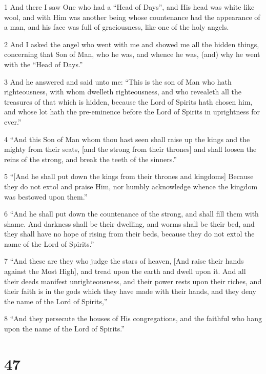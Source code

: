 \par 1 And there I saw One who had a “Head of Days”, and His head was white like wool, and with Him was another being whose countenance had the appearance of a man, and his face was full of graciousness, like one of the holy angels.
\par 2 And I asked the angel who went with me and showed me all the hidden things, concerning that Son of Man, who he was, and whence he was, (and) why he went with the “Head of Days.”
\par 3 And he answered and said unto me: “This is the son of Man who hath righteousness, with whom dwelleth righteousness, and who revealeth all the treasures of that which is hidden, because the Lord of Spirits hath chosen him, and whose lot hath the pre-eminence before the Lord of Spirits in uprightness for ever.”
\par 4 “And this Son of Man whom thou hast seen shall raise up the kings and the mighty from their seats, [and the strong from their thrones] and shall loosen the reins of the strong, and break the teeth of the sinners.”
\par 5 “[And he shall put down the kings from their thrones and kingdoms] Because they do not extol and praise Him, nor humbly acknowledge whence the kingdom was bestowed upon them.”
\par 6 “And he shall put down the countenance of the strong, and shall fill them with shame. And darkness shall be their dwelling, and worms shall be their bed, and they shall have no hope of rising from their beds, because they do not extol the name of the Lord of Spirits.”
\par 7 “And these are they who judge the stars of heaven, [And raise their hands against the Most High], and tread upon the earth and dwell upon it. And all their deeds manifest unrighteousness, and their power rests upon their riches, and their faith is in the gods which they have made with their hands, and they deny the name of the Lord of Spirits,”
\par 8 “And they persecute the houses of His congregations, and the faithful who hang upon the name of the Lord of Spirits.”

\chapter{47}

